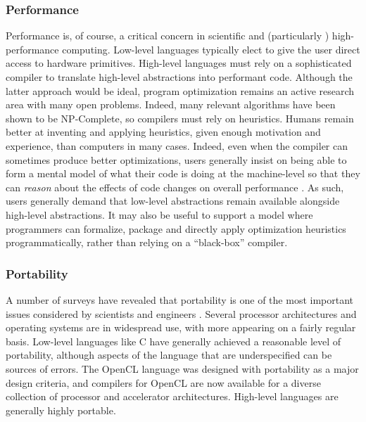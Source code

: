 \documentclass{llncs}
\begin{document}
\subsubsection{Performance}
Performance is, of course, a critical concern in scientific and (particularly \cite{basili2008understanding}) high-performance computing. Low-level languages typically elect to give the user direct access to hardware primitives. High-level languages must rely on a sophisticated compiler to translate high-level abstractions into performant code. Although the latter approach would be ideal, program optimization remains an active research area with many open problems. Indeed, many relevant algorithms have been shown to be NP-Complete, so compilers must rely on heuristics. Humans remain better at inventing and applying heuristics, given enough motivation and experience, than computers in many cases. Indeed, even when the compiler can sometimes produce better optimizations, users generally insist on being able to form a mental model of what their code is doing at the machine-level so that they can {\it reason} about the effects of code changes on overall performance \cite{squires2005programmers}. As such, users generally demand that low-level abstractions remain available alongside high-level abstractions. It may also be useful to support a model where programmers can formalize, package and directly apply optimization heuristics programmatically, rather than relying on a ``black-box'' compiler.


\subsubsection{Portability}\label{portability}
A number of surveys have revealed that portability is one of the most important issues considered by scientists and engineers \cite{hannay2009scientists}\cite{basili2008understanding}. Several processor architectures and operating systems are in widespread use, with more appearing on a fairly regular basis. Low-level languages like C have generally achieved a reasonable level of portability, although aspects of the language that are underspecified can be sources of errors. The OpenCL language was designed with portability as a major design criteria, and compilers for OpenCL are now available for a diverse collection of processor and accelerator architectures. High-level languages are generally highly portable. 
\end{document}

